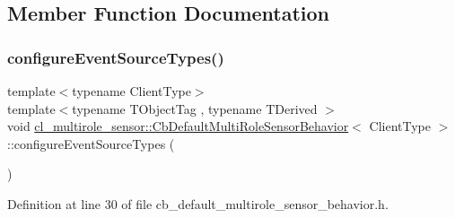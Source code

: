 \subsection{Member Function Documentation}
\mbox{\label{classcl__multirole__sensor_1_1CbDefaultMultiRoleSensorBehavior_a658842c0c467a0592f1f1aab32d5c2c4}} 
\subsubsection{\texorpdfstring{configure\+Event\+Source\+Types()}{configureEventSourceTypes()}}
{\footnotesize\ttfamily template$<$typename Client\+Type$>$ \\
template$<$typename T\+Object\+Tag , typename T\+Derived $>$ \\
void \hyperlink{classcl__multirole__sensor_1_1CbDefaultMultiRoleSensorBehavior}{cl\+\_\+multirole\+\_\+sensor\+::\+Cb\+Default\+Multi\+Role\+Sensor\+Behavior}$<$ Client\+Type $>$\+::configure\+Event\+Source\+Types (\begin{DoxyParamCaption}{ }\end{DoxyParamCaption})\hspace{0.3cm}{\ttfamily [inline]}}



Definition at line 30 of file cb\+\_\+default\+\_\+multirole\+\_\+sensor\+\_\+behavior.\+h.



